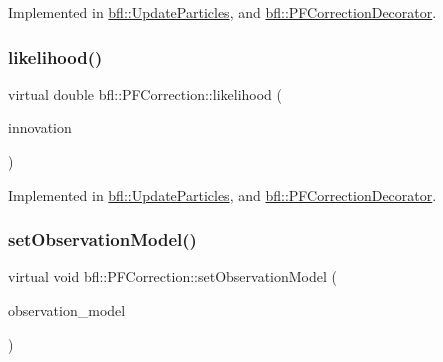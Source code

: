 Implemented in \mbox{\hyperlink{classbfl_1_1UpdateParticles_a8eb8aa7a1cbcf1b285401bc2b0dbed3e}{bfl\+::\+Update\+Particles}}, and \mbox{\hyperlink{classbfl_1_1PFCorrectionDecorator_ac468b6ca9f6991217b6771173c253b42}{bfl\+::\+P\+F\+Correction\+Decorator}}.

\mbox{\label{classbfl_1_1PFCorrection_a4310e630d4c269bd66557e44e5deecb0}} 
\subsubsection{\texorpdfstring{likelihood()}{likelihood()}}
{\footnotesize\ttfamily virtual double bfl\+::\+P\+F\+Correction\+::likelihood (\begin{DoxyParamCaption}\item[{const Eigen\+::\+Ref$<$ const Eigen\+::\+Vector\+Xf $>$ \&}]{innovation }\end{DoxyParamCaption})\hspace{0.3cm}{\ttfamily [pure virtual]}}



Implemented in \mbox{\hyperlink{classbfl_1_1UpdateParticles_a262b9de317562f0361f2db68312b8e27}{bfl\+::\+Update\+Particles}}, and \mbox{\hyperlink{classbfl_1_1PFCorrectionDecorator_a39c3201dbd0821427b684228451faea5}{bfl\+::\+P\+F\+Correction\+Decorator}}.

\mbox{\label{classbfl_1_1PFCorrection_a437fcf552a85f427d1369d8e43e56144}} 
\subsubsection{\texorpdfstring{set\+Observation\+Model()}{setObservationModel()}}
{\footnotesize\ttfamily virtual void bfl\+::\+P\+F\+Correction\+::set\+Observation\+Model (\begin{DoxyParamCaption}\item[{std\+::unique\+\_\+ptr$<$ \mbox{\hyperlink{classbfl_1_1ObservationModel}{Observation\+Model}} $>$}]{observation\+\_\+model }\end{DoxyParamCaption})\hspace{0.3cm}{\ttfamily [pure virtual]}}



